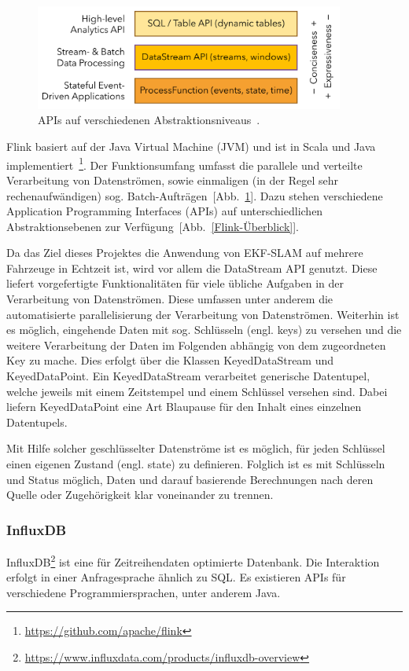 \documentclass[11pt]{article}
\begin{document}
\begin{figure}[!t]
	\centering
	\includegraphics[width=4in]{Flink-api-stack.png}
	\caption{APIs auf verschiedenen Abstraktionsniveaus~\cite{Flink-Grafik-Link}.}
	\label{Flink-APIs}
\end{figure}

Flink basiert auf der Java Virtual Machine (JVM) und ist in Scala und Java implementiert~\footnote{\url{https://github.com/apache/flink}}. Der Funktionsumfang umfasst die parallele und verteilte Verarbeitung von Datenströmen, sowie einmaligen (in der Regel sehr rechenaufwändigen) sog. Batch-Aufträgen~[Abb.~\ref{Flink-APIs}]. Dazu stehen verschiedene Application Programming Interfaces (APIs) auf unterschiedlichen Abstraktionsebenen zur Verfügung~[Abb.~\ref{Flink-Überblick}].

Da das Ziel dieses Projektes die Anwendung von EKF-SLAM auf mehrere Fahrzeuge in Echtzeit ist, wird vor allem die DataStream API genutzt. Diese liefert vorgefertigte Funktionalitäten für viele übliche Aufgaben in der Verarbeitung von Datenströmen. Diese umfassen unter anderem die automatisierte parallelisierung der Verarbeitung von Datenströmen. Weiterhin ist es möglich, eingehende Daten mit sog. Schlüsseln (engl. keys) zu versehen und die weitere Verarbeitung der Daten im Folgenden abhängig von dem zugeordneten Key zu mache. Dies erfolgt über die Klassen KeyedDataStream und KeyedDataPoint. Ein KeyedDataStream verarbeitet generische Datentupel, welche jeweils mit einem Zeitstempel und einem Schlüssel versehen sind. Dabei liefern KeyedDataPoint eine Art Blaupause für den Inhalt eines einzelnen Datentupels.

Mit Hilfe solcher geschlüsselter Datenströme ist es möglich, für jeden Schlüssel einen eigenen Zustand (engl. state) zu definieren. Folglich ist es mit Schlüsseln und Status möglich, Daten und darauf basierende Berechnungen nach deren Quelle oder Zugehörigkeit klar voneinander zu trennen.

\subsubsection{InfluxDB}
InfluxDB\footnote{\url{https://www.influxdata.com/products/influxdb-overview}} ist eine für Zeitreihendaten optimierte Datenbank. Die Interaktion erfolgt in einer Anfragesprache ähnlich zu SQL. Es existieren APIs für verschiedene Programmiersprachen, unter anderem Java. 
\end{document}
